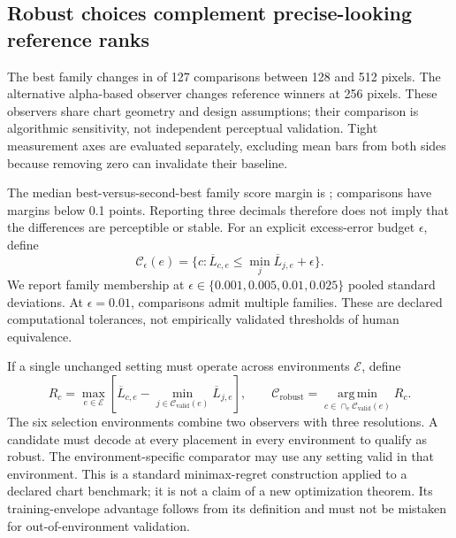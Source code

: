 \documentclass[11pt]{article}
\begin{document}
\subsection*{Robust choices complement precise-looking reference ranks}
The best family changes in \ResolutionChanged{} of 127 comparisons between 128 and 512 pixels. The alternative alpha-based observer changes \ObserverChanged{} reference winners at 256 pixels. These observers share chart geometry and design assumptions; their comparison is algorithmic sensitivity, not independent perceptual validation. Tight measurement axes are evaluated separately, excluding mean bars from both sides because removing zero can invalidate their baseline.

The median best-versus-second-best family score margin is \MarginMedian{}; \SmallMargins{} comparisons have margins below 0.1 points. Reporting three decimals therefore does not imply that the differences are perceptible or stable. For an explicit excess-error budget $\epsilon$, define
\begin{equation}
\mathcal C_\epsilon(e)=\{c:\overline L_{c,e}\leq\min_j\overline L_{j,e}+\epsilon\}.
\end{equation}
We report family membership at $\epsilon\in\{0.001,0.005,0.01,0.025\}$ pooled standard deviations. At $\epsilon=0.01$, \NearCount{} comparisons admit multiple families. These are declared computational tolerances, not empirically validated thresholds of human equivalence.

If a single unchanged setting must operate across environments $\mathcal E$, define
\begin{equation}
R_c=\max_{e\in\mathcal E}\left[\overline L_{c,e}-\min_{j\in\mathcal C_{\mathrm{valid}}(e)}\overline L_{j,e}\right],
\qquad\mathcal C_{\mathrm{robust}}=\operatorname*{arg\,min}_{c\in\cap_e\mathcal C_{\mathrm{valid}}(e)}R_c.
\label{eq:regret}
\end{equation}
The six selection environments combine two observers with three resolutions. A candidate must decode at every placement in every environment to qualify as robust. The environment-specific comparator may use any setting valid in that environment. This is a standard minimax-regret construction applied to a declared chart benchmark; it is not a claim of a new optimization theorem. Its training-envelope advantage follows from its definition and must not be mistaken for out-of-environment validation.
\end{document}
